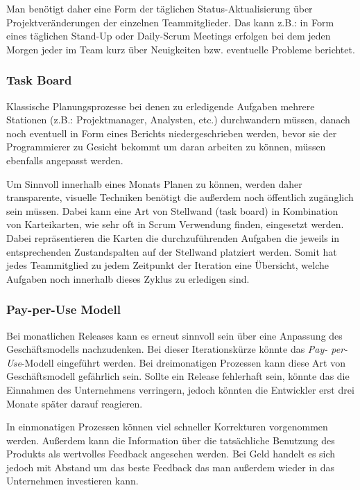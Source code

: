 Man benötigt daher eine Form der täglichen Status-Aktualisierung über
Projektveränderungen der einzelnen Teammitglieder. Das kann z.B.: in Form
eines täglichen Stand-Up oder Daily-Scrum Meetings erfolgen bei dem jeden
Morgen jeder im Team kurz über Neuigkeiten bzw. eventuelle Probleme berichtet.

\subsubsection{Task Board}
\label{minisec:task}
Klassische Planungsprozesse bei denen zu erledigende Aufgaben mehrere
Stationen (z.B.: Projektmanager, Analysten, etc.) durchwandern müssen, danach
noch eventuell in Form eines Berichts niedergeschrieben werden, bevor sie der
Programmierer zu Gesicht bekommt um daran arbeiten zu können, müssen ebenfalls
angepasst werden.

Um Sinnvoll innerhalb eines Monats Planen zu können, werden daher
transparente, visuelle Techniken benötigt die außerdem noch öffentlich
zugänglich sein müssen. Dabei kann eine Art von Stellwand (task board) in
Kombination von Karteikarten, wie sehr oft in Scrum Verwendung finden,
eingesetzt werden. Dabei repräsentieren die Karten die durchzuführenden
Aufgaben die jeweils in entsprechenden Zustandspalten auf der Stellwand
platziert werden. Somit hat jedes Teammitglied zu jedem Zeitpunkt der
Iteration eine Übersicht, welche Aufgaben noch innerhalb dieses Zyklus zu
erledigen sind.

\subsubsection{Pay-per-Use Modell}
\label{minisec:pay-per-use-modell}

Bei monatlichen Releases kann es erneut sinnvoll sein über eine Anpassung des
Geschäftsmodells nachzudenken.  Bei dieser Iterationskürze könnte das \emph{Pay-
per-Use}-Modell eingeführt werden. Bei dreimonatigen Prozessen kann diese Art
von Geschäftsmodell gefährlich sein. Sollte ein Release fehlerhaft sein,
könnte das die Einnahmen des Unternehmens verringern, jedoch könnten die
Entwickler erst drei Monate später darauf reagieren.

In einmonatigen Prozessen können viel schneller Korrekturen vorgenommen
werden. Außerdem kann die Information über die tatsächliche Benutzung des
Produkts als wertvolles Feedback angesehen werden. Bei Geld handelt es sich
jedoch mit Abstand um das beste Feedback das man außerdem wieder in das
Unternehmen investieren kann.

